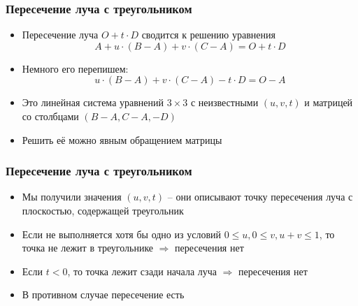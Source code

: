 \documentclass[handout,10pt]{beamer}
\begin{document}
\begin{frame}
\frametitle{Пересечение луча с треугольником}
\begin{itemize}
\item Пересечение луча \begin{math}O + t\cdot D\end{math} сводится к решению уравнения
\begin{equation*}
A + u\cdot (B-A) + v\cdot (C-A) = O + t\cdot D
\end{equation*}
\pause
\item Немного его перепишем:
\begin{equation*}
u\cdot (B-A) + v\cdot (C-A) - t\cdot D = O - A
\end{equation*}
\pause
\item Это линейная система уравнений \begin{math}3\times 3\end{math} с неизвестными \begin{math}(u,v,t)\end{math} и матрицей со столбцами \begin{math}(B-A, C-A, -D)\end{math}
\pause
\item Решить её можно явным обращением матрицы
\end{itemize}
\end{frame}

\begin{frame}
\frametitle{Пересечение луча с треугольником}
\begin{itemize}
\item Мы получили значения \begin{math}(u,v,t)\end{math} -- они описывают точку пересечения луча с плоскостью, содержащей треугольник
\pause
\item Если не выполняется хотя бы одно из условий \begin{math}0\leq u, 0\leq v, u+v \leq 1\end{math}, то точка не лежит в треугольнике \begin{math}\Longrightarrow\end{math} пересечения нет
\pause
\item Если \begin{math}t < 0\end{math}, то точка лежит сзади начала луча \begin{math}\Longrightarrow\end{math} пересечения нет
\pause
\item В противном случае пересечение есть
\end{itemize}
\end{frame}
\end{document}
